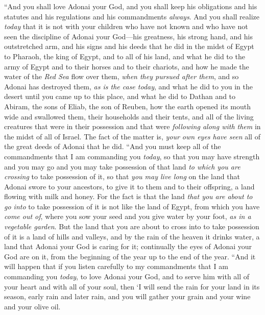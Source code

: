 \begin{biblechapter} %
\verse “And you shall love Adonai your God, and you shall keep his obligations and his statutes and his regulations and his commandments \textit{always}.
\verse And you shall realize \textit{today} that it is not with your children who have not known and who have not seen the discipline of Adonai your God—his greatness, his strong hand, and his outstretched arm,
\verse and his signs and his deeds that he did in the midst of Egypt to Pharaoh, the king of Egypt, and to all of his land,
\verse and what he did to the army of Egypt and to their horses and to their chariots, and how he made the water of the \textit{Red Sea} flow over them, \textit{when they pursued after them}, and so Adonai has destroyed them, \textit{as is the case today},
\verse and what he did to you in the desert until you came up to this place,
\verse and what he did to Dathan and to Abiram, the sons of Eliab, the son of Reuben, how the earth opened its mouth wide and swallowed them, their households and their tents, and all of the living creatures that were in their possession and that were \textit{following along with them} in the midst of all of Israel.
\verse The fact of the matter is, \textit{your own eyes have seen} all of the great deeds of Adonai that he did.
\verse “And you must keep all of the commandments that I am commanding you \textit{today}, so that you may have strength and you may go and you may take possession of that land \textit{to which you are crossing} to take possession of it,
\verse so that \textit{you may live long} on the land that Adonai swore to your ancestors, to give it to them and to their offspring, a land flowing with milk and honey.
\verse For the fact is that the land \textit{that you are about to go into} to take possession of it is not like the land of Egypt, from which you have \textit{come out of}, where you sow your seed and you give water by your foot, \textit{as in a vegetable garden}.
\verse But the land that you are about to cross into to take possession of it is a land of hills and valleys, and by the rain of the heaven it drinks water,
\verse a land that Adonai your God is caring for it; continually the eyes of Adonai your God are on it, from the beginning of the year up to the end of the year.
\verse “And it will happen that if you listen carefully to my commandments that I am commanding you \textit{today}, to love Adonai your God, and to serve him with all of your heart and with all of your soul,
\verse then ‘I will send the rain for your land in its season, early rain and later rain, and you will gather your grain and your wine and your olive oil.

\end{biblechapter}
